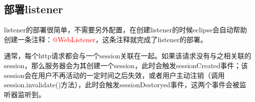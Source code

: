 \subsection{部署listener}
listener的部署很简单，不需要另外配置，在创建listener的时候eclipse会自动帮助创建一条注释：\textcolor{red}{@WebListener}，这条注释就完成了listener的部署。

通常，每个http请求都会与一个session关联在一起。如果该请求没有与之相关联的session，那么服务器会为其创建一个session，此时会触发sessionCreated事件；该session会在用户不再活动的一定时间之后失效，或者用户主动注销（调用session.invalidate()方法），此时会触发sessionDestoryed事件，这两个事件会被监听器监听到。

